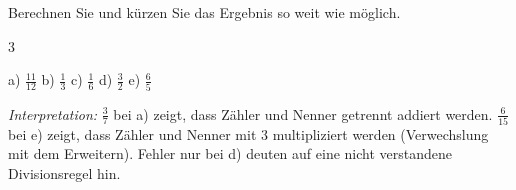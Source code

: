 \documentclass[11pt]{exam}
\newcommand{\aufgabe}[1]{%
  \needspace{8\baselineskip}%
  \renewcommand{\questionlabel}{\textbf{#1}}%
  \question}
\newcommand{\geteilt}{\mathbin{:}}
\newcommand{\raum}[1]{\ifprintanswers\else\fillwithgrid{#1}\fi}
\newcommand{\bruchabstand}{\setlength{\itemsep}{2.5ex}}
\newcommand{\diagnose}[1]{\par\smallskip\textit{Interpretation:} #1}
\begin{document}
\begin{questions}
\aufgabe{3.3}
Berechnen Sie und kürzen Sie das Ergebnis so weit wie möglich.
\begin{multicols}{3}
\end{multicols}
\begin{solution}
  a) $\frac{11}{12}$ \quad b) $\frac{1}{3}$ \quad c) $\frac{1}{6}$ \quad
  d) $\frac{3}{2}$ \quad e) $\frac{6}{5}$
  \diagnose{$\frac{3}{7}$ bei a) zeigt, dass Zähler und Nenner getrennt addiert
  werden. $\frac{6}{15}$ bei e) zeigt, dass Zähler und Nenner mit $3$
  multipliziert werden (Verwechslung mit dem Erweitern). Fehler nur bei d)
  deuten auf eine nicht verstandene Divisionsregel hin.}
\end{solution}
\raum{4cm}


\end{questions}
\end{document}
